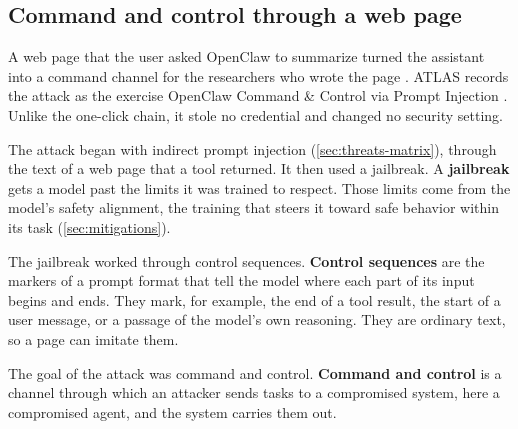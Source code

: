 \subsection{Command and control through a web page}
\label{sec:openclaw-c2}

A web page that the user asked OpenClaw to summarize turned the assistant into a command channel for
the researchers who wrote the page \citep{mccauley2026openclaw}. ATLAS records the attack as the
exercise OpenClaw Command \& Control via Prompt Injection \citep{atlas-cs0051-openclaw-c2}. Unlike
the one-click chain, it stole no credential and changed no security setting.

The attack began with indirect prompt injection (\cref{sec:threats-matrix}), through the text of a
web page that a tool returned. It then used a jailbreak. A \textbf{jailbreak} gets a model past the limits it was trained to
respect. Those limits come from the model's safety alignment, the training that steers it toward
safe behavior within its task (\cref{sec:mitigations}).

The jailbreak worked through control sequences. \textbf{Control sequences} are the markers of a
prompt format that tell the model where each part of its input begins and ends. They mark, for
example, the end of a tool result, the start of a user message, or a passage of the model's own
reasoning. They are ordinary text, so a page can imitate them.

The goal of the attack was command and control. \textbf{Command and control} is a channel through
which an attacker sends tasks to a compromised system, here a compromised agent, and the system
carries them out.

